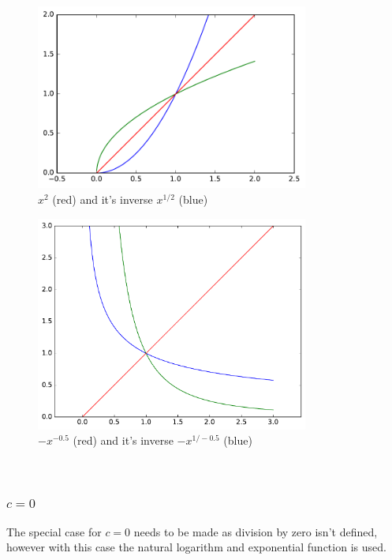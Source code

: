 \begin{figure}[h!]
\centering
\includegraphics[width=0.8\textwidth]{figs/a_2_sgn_pow.pdf}
\caption{$x^2$ (red) and it's inverse $x^{1/2}$ (blue)}
\label{fig:sgn_pow}
\end{figure}

\begin{figure}[h!]
\centering
\includegraphics[width=0.8\textwidth]{figs/a_0_5_sgn_pow.pdf}
\caption{$-x^{-0.5}$ (red) and it's inverse $-x^{1/-0.5}$ (blue)}
\label{fig:sgn_pow_0_5}
\end{figure}

\pagebreak

\ \\

\pagebreak

\subsubsection{$c = 0$}

The special case for $c = 0$ needs to be made as division by zero isn't defined, however with this case the natural logarithm and exponential function is used.


